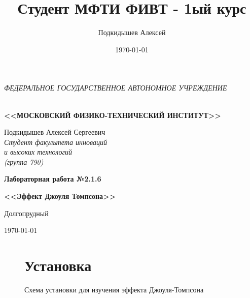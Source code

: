 \documentclass[a4paper,12pt]{article}
\author{Подкидышев Алексей}
\title{Студент МФТИ ФИВТ - 1ый курс}
\date{\today}
\theoremstyle{plain} %
\theoremstyle{definition} %
\theoremstyle{remark} %
\begin{document}
 
\begin{center}
	\textit{\MakeTextUppercase{федеральное государственное автономное учреждение}}
		
	\vspace{0.5ex}
	
	\textbf{ \\ \MakeTextUppercase{<<Московский Физико-технический институт>>}}
\end{center}
\vspace{13ex}
\begin{flushright}
	\noindent
	{Подкидышев Алексей Сергеевич}
	\\
	\textit{Студент факультета инноваций\\ и высоких технологий\\(группа 790)}
\end{flushright}
\begin{center}
	\vspace{23ex}
	{\LARGE\textbf{Лабораторная работа №2.1.6}}
	\vspace{1ex}
		
	\textbf{\large{<<Эффект Джоуля Томпсона>>}}
	
	\vfill
	Долгопрудный 
	
	{\today}
\end{center}

\newpage

\begin{figure} [h] \label{sheme}

\section{Установка}  
\caption{Схема установки для изучения эффекта Джоуля-Томпсона}
\end{figure}
\end{document}
